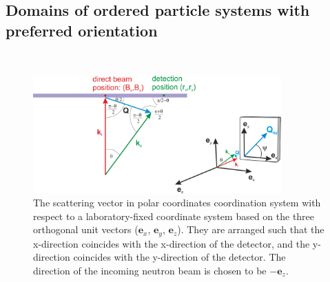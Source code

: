 \subsection{Domains of ordered particle systems with preferred orientation}
\label{subsec:aniso_ops}
~\newline



\begin{figure}[htb]
\begin{center}
\includegraphics[width=0.85\textwidth]{osp_coord_system.png}
\end{center}
\caption{The scattering vector in polar coordinates coordination system with respect to a laboratory-fixed coordinate system based on the three orthogonal unit vectors ($\mathbf{e}_x$, $\mathbf{e}_y$, $\mathbf{e}_z$). They are arranged such that the x-direction coincides with the x-direction of the detector, and the y-direction coincides with the y-direction of the detector. The direction of the incoming neutron beam is chosen to be $-\mathbf{e}_z$. } \label{fig:opsCoordSys}
\end{figure}


